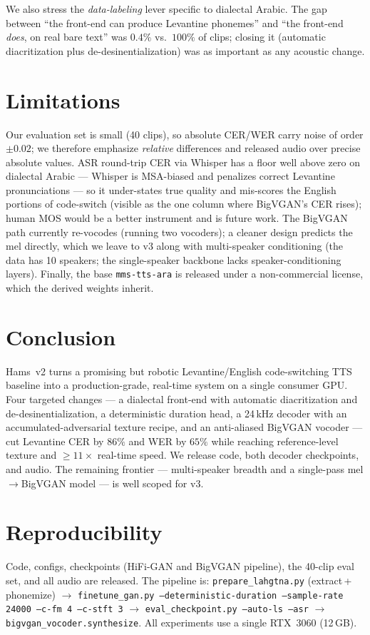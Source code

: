 \documentclass[10pt,twocolumn]{article}
\begin{document}
We also stress the \emph{data-labeling} lever specific to dialectal Arabic. The gap between
``the front-end can produce Levantine phonemes'' and ``the front-end \emph{does}, on real
bare text'' was \(0.4\%\) vs.\ \(100\%\) of clips; closing it (automatic diacritization plus
de-desinentialization) was as important as any acoustic change.

\section{Limitations}
Our evaluation set is small (40 clips), so absolute CER/WER carry noise of order \(\pm0.02\);
we therefore emphasize \emph{relative} differences and released audio over precise absolute
values. ASR round-trip CER via Whisper has a floor well above zero on dialectal
Arabic --- Whisper is MSA-biased and penalizes correct Levantine pronunciations --- so it
under-states true quality and mis-scores the English portions of code-switch (visible as the
one column where BigVGAN's CER rises); human MOS would be a better instrument and is future
work. The BigVGAN path currently re-vocodes (running two vocoders); a cleaner design predicts
the mel directly, which we leave to v3 along with multi-speaker conditioning (the data has 10
speakers; the single-speaker backbone lacks speaker-conditioning layers). Finally, the base
\texttt{mms-tts-ara} is released under a non-commercial license, which the derived weights
inherit.

\section{Conclusion}
Hams~v2 turns a promising but robotic Levantine/English code-switching TTS baseline into a
production-grade, real-time system on a single consumer GPU. Four targeted changes ---
a dialectal front-end with automatic diacritization and de-desinentialization, a deterministic
duration head, a 24\,kHz decoder with an accumulated-adversarial texture recipe, and an
anti-aliased BigVGAN vocoder --- cut Levantine CER by \(86\%\) and WER by \(65\%\) while
reaching reference-level texture and \(\geq\!11\times\) real-time speed. We release code,
both decoder checkpoints, and audio. The remaining frontier --- multi-speaker breadth and a
single-pass mel\(\rightarrow\)BigVGAN model --- is well scoped for v3.

\section*{Reproducibility}
Code, configs, checkpoints (HiFi-GAN and BigVGAN pipeline), the 40-clip eval set, and all
audio are released. The pipeline is:
\texttt{prepare\_lahgtna.py} (extract\,+\,phonemize) \(\rightarrow\)
\texttt{finetune\_gan.py --deterministic-duration --sample-rate 24000 --c-fm 4 --c-stft 3}
\(\rightarrow\) \texttt{eval\_checkpoint.py --auto-ls --asr} \(\rightarrow\)
\texttt{bigvgan\_vocoder.synthesize}. All experiments use a single RTX~3060 (12\,GB).
\end{document}
